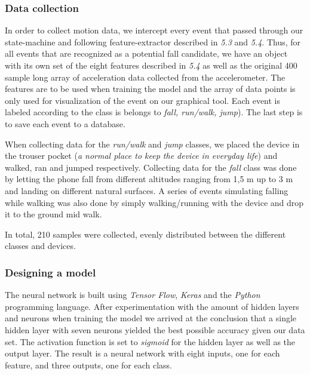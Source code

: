 \documentclass[12pt, a4paper, onecolumn]{article}
\begin{document}
	\subsubsection{Data collection}
	In order to collect motion data, we intercept every event that passed through our state-machine and following feature-extractor described in \textit{5.3} and \textit{5.4}. Thus, for all events that are recognized as a potential fall candidate, we have an object with its own set of the eight features described in \textit{5.4} as well as the original 400 sample long array of acceleration data collected from the accelerometer. The features are to be used when training the model and the array of data points is only used for visualization of the event on our graphical tool. Each event is labeled according to the class is belongs to \textit{fall, run/walk, jump}). The last step is to save each event to a database. 
	
	When collecting data for the \textit{run/walk} and \textit{jump} classes, we placed the device in the trouser pocket (\textit{a normal place to keep the device in everyday life}) and walked, ran and jumped respectively. Collecting data for the \textit{fall} class was done by letting the phone fall from different altitudes ranging from 1,5 m up to 3 m and landing on different natural surfaces. A series of events simulating falling while walking was also done by simply walking/running with the device and drop it to the ground mid walk.
	
	In total, 210 samples were collected, evenly distributed between the different classes and devices.
	
	\subsubsection{Designing a model}
	The neural network is built using \textit{Tensor Flow}, \textit{Keras} and the \textit{Python} programming language. After experimentation with the amount of hidden layers and neurons when training the model we arrived at the conclusion that a single hidden layer with seven neurons yielded the best possible accuracy given our data set. The activation function is set to \textit{sigmoid} for the hidden layer as well as the output layer. The result is a neural network with eight inputs, one for each feature, and three outputs, one for each class. 
	
\end{document}
